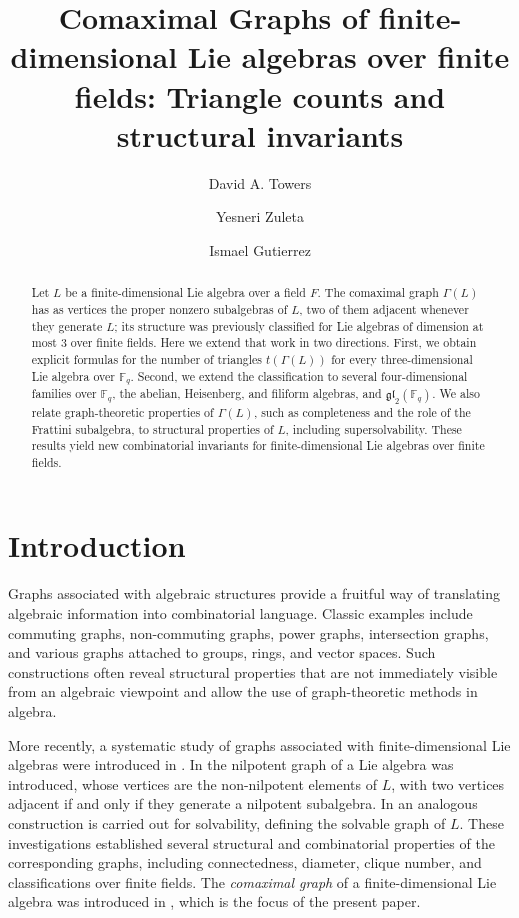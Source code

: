 \documentclass[11pt]{amsart}
\title[Comaximal Graphs of finite-dimensional Lie algebras]{Comaximal Graphs of finite-dimensional Lie algebras over finite fields: Triangle counts and structural invariants}
\author{David A. Towers}
\author{Yesneri Zuleta}
\author{Ismael Gutierrez}
\theoremstyle{plain}
\def\F{\mathbb{F}}
\begin{document}
 


\begin{abstract}
Let $L$ be a finite-dimensional Lie algebra over a field $F$. The comaximal graph $\Gamma(L)$ has as vertices the proper nonzero subalgebras of $L$, two of them adjacent whenever they generate $L$; its structure was previously classified for Lie algebras of dimension at most 3 over finite fields. Here we extend that work in two directions. First, we obtain explicit formulas for the number of triangles $t(\Gamma(L))$ for every three-dimensional Lie algebra over $\F_q$. Second, we extend the classification to several four-dimensional families over $\mathbb{F}_q$, the abelian, Heisenberg, and filiform algebras, and $\mathfrak{gl}_2(\F_q)$. We also relate graph-theoretic properties of $\Gamma(L)$, such as completeness and the role of the Frattini subalgebra, to structural properties of $L$, including supersolvability. These results yield new combinatorial invariants for finite-dimensional Lie algebras over finite fields.
\end{abstract}

\maketitle



 
\section{Introduction}

Graphs associated with algebraic structures provide a fruitful way of translating algebraic information into combinatorial language. Classic examples include commuting graphs, non-commuting graphs, power graphs, intersection graphs, and various graphs attached to groups, rings, and vector spaces. Such constructions often reveal structural properties that are not immediately visible from an algebraic viewpoint and allow the use of graph-theoretic methods in algebra.

More recently, a systematic study of graphs associated with finite-dimensional
Lie algebras were introduced in \cite{TGF, TGF2, TZG}. In \cite{TGF} the nilpotent graph of a Lie algebra was introduced, whose vertices are the non-nilpotent elements of $L$, with two vertices adjacent if and only if they generate a nilpotent subalgebra. In \cite{TGF2} an analogous construction is carried out for solvability, defining the solvable graph of $L$.  These investigations established several structural and combinatorial properties of the corresponding graphs, including connectedness, diameter, clique number, and classifications over finite
fields. The \emph{comaximal graph} of a finite-dimensional Lie algebra was introduced in \cite{TZG}, which is the focus of the present paper.
\end{document}
